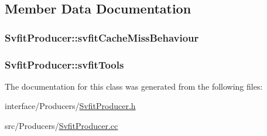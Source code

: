 \subsection{Member Data Documentation}
\hypertarget{classSvfitProducer_a74c771b1c8d35938af552a7635844c76}{
\subsubsection[{svfitCacheMissBehaviour}]{ {\bf SvfitProducer::svfitCacheMissBehaviour}}}
\label{classSvfitProducer_a74c771b1c8d35938af552a7635844c76}
\hypertarget{classSvfitProducer_a5c2ef16c786f2db347ef45f1cc54500a}{
\subsubsection[{svfitTools}]{ {\bf SvfitProducer::svfitTools}}}
\label{classSvfitProducer_a5c2ef16c786f2db347ef45f1cc54500a}


The documentation for this class was generated from the following files:\begin{DoxyCompactItemize}
\item 
interface/Producers/\hyperlink{SvfitProducer_8h}{SvfitProducer.h}\item 
src/Producers/\hyperlink{SvfitProducer_8cc}{SvfitProducer.cc}\end{DoxyCompactItemize}
